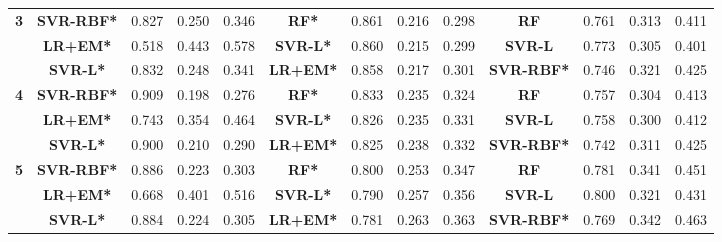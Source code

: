 \begin{table*}
{\begin{tabular}{|c|c|c|c|c|c|c|c|c|c|c|c|c|}
\multirow{3}{*}{\textbf{3}} & \textbf{SVR-RBF*} & 0.827          & 0.250        & 0.346         & \textbf{RF*}    & 0.861          & 0.216        & 0.298         & \textbf{RF}      & 0.761                              & 0.313                            & 0.411                             \\
            & \textbf{LR+EM*}   & 0.518          & 0.443        & 0.578         & \textbf{SVR-L*} & 0.860          & 0.215        & 0.299         & \textbf{SVR-L}   & 0.773                              & 0.305                            & 0.401                             \\
            & \textbf{SVR-L*}   & 0.832          & 0.248        & 0.341         & \textbf{LR+EM*} & 0.858          & 0.217        & 0.301         & \textbf{SVR-RBF*} & 0.746                              & 0.321                            & 0.425                             \\\hline
\multirow{3}{*}{\textbf{4}} & \textbf{SVR-RBF*} & 0.909          & 0.198        & 0.276         & \textbf{RF*}    & 0.833          & 0.235        & 0.324         & \textbf{RF}      & 0.757                              & 0.304                            & 0.413                             \\
            & \textbf{LR+EM*}   & 0.743          & 0.354        & 0.464         & \textbf{SVR-L*} & 0.826          & 0.235        & 0.331         & \textbf{SVR-L}   & 0.758                              & 0.300                            & 0.412                             \\
            & \textbf{SVR-L*}   & 0.900          & 0.210        & 0.290         & \textbf{LR+EM*} & 0.825          & 0.238        & 0.332         & \textbf{SVR-RBF*} & 0.742                              & 0.311                            & 0.425                             \\\hline
\multirow{3}{*}{\textbf{5}} & \textbf{SVR-RBF*} & 0.886          & 0.223        & 0.303         & \textbf{RF*}    & 0.800          & 0.253        & 0.347         & \textbf{RF}      & 0.781                              & 0.341                            & 0.451                             \\
            & \textbf{LR+EM*}   & 0.668          & 0.401        & 0.516         & \textbf{SVR-L*} & 0.790          & 0.257        & 0.356         & \textbf{SVR-L}   & 0.800                              & 0.321                            & 0.431                             \\
            & \textbf{SVR-L*}   & 0.884          & 0.224        & 0.305         & \textbf{LR+EM*} & 0.781          & 0.263        & 0.363         & \textbf{SVR-RBF*} & 0.769                              & 0.342                            & 0.463                             \\\hline

\end{tabular}}
\end{table*}
